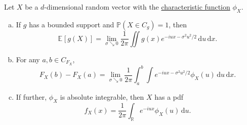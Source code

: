 \begin{theorem}\label{thm:Feller-inversion-formula}
	Let \(X\) be a \(d\)-dimensional random vector with the \hyperref[def:characteristic-function]{characteristic function} \(\phi _X\).
	\begin{enumerate}[(a)]
		\item\label{thm:Feller-inversion-formula:a} If \(g\) has a bounded support and \(\mathbb{P} (X \in C_g) = 1\), then
		      \[
			      \mathbb{E}_{}[g(X)]
			      = \lim_{\sigma \searrow 0} \frac{1}{2\pi } \iint g(x) e^{-iux - \sigma ^2 u^2 / 2} \,\mathrm{d} u \,\mathrm{d} x .
		      \]
		\item\label{thm:Feller-inversion-formula:b} For any \(a, b \in C_{F_X}\),
		      \[
			      F_X(b) - F_X(a)
			      = \lim_{\sigma \searrow 0} \frac{1}{2\pi } \int_{a}^{b} \int e^{-iux - \sigma ^2 u^2 / 2} \phi _X(u) \,\mathrm{d}u \,\mathrm{d} x .
		      \]
		\item\label{thm:Feller-inversion-formula:c} If further, \(\phi _X\) is absolute integrable, then \(X\) has a pdf
		      \[
			      f_X(x) = \frac{1}{2\pi } \int _\mathbb{R} e^{-iux} \phi _X(u) \,\mathrm{d} u.
		      \]
	\end{enumerate}
\end{theorem}
